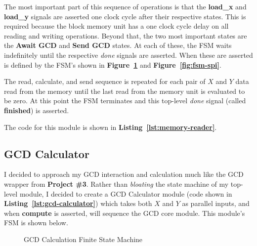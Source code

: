 \documentclass[a4paper, 12pt]{article}
\begin{document}
The most important part of this sequence of operations is that the \textbf{load\_x} and \textbf{load\_y} signals are asserted one clock cycle after their respective states. This is required because the block memory unit has a one clock cycle delay on all reading and writing operations. Beyond that, the two most important states are the \textbf{Await GCD} and \textbf{Send GCD} states. At each of these, the FSM waits indefinitely until the respective \textit{done} signals are asserted. When these are asserted is defined by the FSM's shown in \textbf{Figure~\ref{fig:fsm-gcd-calculator}} and \textbf{Figure~\ref{fig:fsm-spi}}.

The read, calculate, and send sequence is repeated for each pair of $X$ and $Y$ data read from the memory until the last read from the memory unit is evaluated to be zero. At this point the FSM terminates and this top-level \textit{done} signal (called \textbf{finished}) is asserted.

The code for this module is shown in \textbf{Listing~\ref{lst:memory-reader}}.

\subsection{GCD Calculator}
I decided to approach my GCD interaction and calculation much like the GCD wrapper from \textbf{Project \#3}. Rather than \textit{bloating} the state machine of my top-level module, I decided to create a GCD Calculator module (code shown in \textbf{Listing~\ref{lst:gcd-calculator}}) which takes both $X$ and $Y$ as parallel inputs, and when \textbf{compute} is asserted, will sequence the GCD core module. This module's FSM is shown below.

\begin{figure}[H]
\centering
{}
\caption{GCD Calculation Finite State Machine}
\label{fig:fsm-gcd-calculator}
\end{figure}
\end{document}
